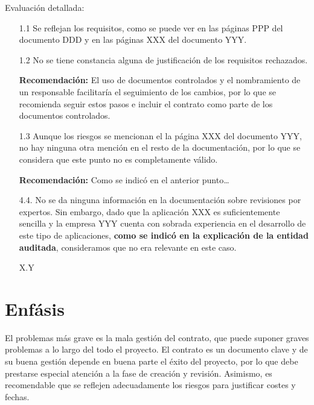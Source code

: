 Evaluaci\'on detallada:
\begin{itemize}
\item[1.1] Se reflejan los requisitos, como se puede ver
en las p\'aginas PPP del documento DDD y en las p\'aginas XXX
del documento YYY.

\item[1.2] No se tiene constancia alguna de justificaci\'on
de los requisitos rechazados.

\textbf{Recomendaci\'on:} El uso de documentos controlados y
el nombramiento de un responsable facilitar\'ia el seguimiento
de los cambios, por lo que se recomienda seguir estos pasos e
incluir el contrato como parte de los documentos controlados.


\item[1.3] Aunque los riesgos se mencionan el la p\'agina
XXX del documento YYY, no hay ninguna otra menci\'on en el resto
de la documentaci\'on, por lo que se considera que este punto
no es completamente v\'alido.

\textbf{Recomendaci\'on:} Como se indic\'o en el anterior punto\ldots
{}

\item[4.4.] No se da ninguna informaci\'on en la documentaci\'on sobre
revisiones por expertos. Sin embargo, dado que la aplicaci\'on XXX es
suficientemente sencilla y la empresa YYY cuenta con sobrada experiencia
en el desarrollo de este tipo de aplicaciones, \textbf{como se indic\'o en la
explicaci\'on de la entidad auditada}, consideramos que no era relevante
en este caso.

\item[X.Y] 
\end{itemize}

\section*{Enf\'asis}

El problemas m\'as grave es la mala gesti\'on del contrato, que puede suponer
graves problemas a lo largo del todo el proyecto. El contrato es un documento
clave y de su buena gesti\'on depende en buena parte el \'exito del proyecto,
por lo que debe prestarse especial atenci\'on a la fase de creaci\'on y revisi\'on.
Asimismo, es recomendable que se reflejen adecuadamente los riesgos para justificar
costes y fechas.


